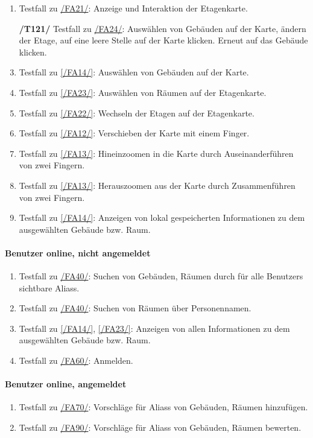 \begin{enumerate}[label=\textbf{/T\arabic*0/}, align=left]
	\item \label{/T120/} Testfall zu \hyperref[/FA21/]{/FA21/}: Anzeige und Interaktion der \Gls{Etagenkarte}.
	\item[\textbf{/T121/}] \label{/T121/} Testfall zu \hyperref[/FA24/]{/FA24/}: Auswählen von Gebäuden auf der \Gls{Karte}, ändern der Etage, auf eine leere Stelle auf der \Gls{Karte} klicken. Erneut auf das Gebäude klicken.
	\item \label{/T130/} Testfall zu \ref{/FA14/}: Auswählen von Gebäuden auf der \Gls{Karte}.
	\item \label{/T140/} Testfall zu \ref{/FA23/}: Auswählen von Räumen auf der \Gls{Etagenkarte}.
	\item \label{/T150/} Testfall zu \ref{/FA22/}: Wechseln der Etagen auf der \Gls{Etagenkarte}.
	\item \label{/T160/} Testfall zu \ref{/FA12/}: Verschieben der \Gls{Karte} mit einem Finger.
	\item \label{/T170/} Testfall zu \ref{/FA13/}: Hineinzoomen in die \Gls{Karte} durch Auseinanderführen von zwei Fingern.
	\item \label{/T180/} Testfall zu \ref{/FA13/}: Herauszoomen aus der \Gls{Karte} durch Zusammenführen von zwei Fingern.
	\item \label{/T190/} Testfall zu \ref{/FA14/}: Anzeigen von \gls{lokal} gespeicherten Informationen zu dem ausgewählten Gebäude bzw. Raum.
\end{enumerate}

\paragraph{\Gls{Benutzer} online, nicht angemeldet}
\begin{enumerate}[label=\textbf{/T\arabic*0/}, align=left, resume]
	\item \label{/T200/} Testfall zu \hyperref[/FA40/]{/FA40/}: Suchen von Gebäuden, Räumen durch für alle \Glspl{Benutzer} sichtbare \Glspl{Alias}.
	\item \label{/T210/} Testfall zu \hyperref[/FA40/]{/FA40/}: Suchen von Räumen über Personennamen.
	\item \label{/T220/} Testfall zu \ref{/FA14/}, \ref{/FA23/}: Anzeigen von allen Informationen zu dem ausgewählten Gebäude bzw. Raum.
	\item \label{/T230/} Testfall zu \hyperref[/FA60/]{/FA60/}: Anmelden.
\end{enumerate}

\paragraph{\Gls{Benutzer} online, angemeldet}
\begin{enumerate}[label=\textbf{/T\arabic*0/}, align=left, resume]
	\item \label{/T240/} Testfall zu \hyperref[/FA70/]{/FA70/}: Vorschläge für \Glspl{Alias} von Gebäuden, Räumen hinzufügen.
	\item \label{/T250/} Testfall zu \hyperref[/FA90/]{/FA90/}: Vorschläge für \Glspl{Alias} von Gebäuden, Räumen bewerten.
\end{enumerate}

